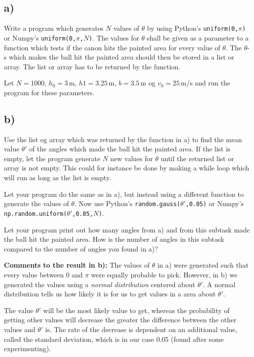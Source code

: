 \documentclass[10pt,a4paper]{article}
\begin{document}
\subsection*{a)}
Write a program which generates $N$ values of $\theta$ by using Python's  \texttt{uniform(0,$\pi$)} or  Numpy's \texttt{uniform(0,$\pi$,$N$)}.
The values for $\theta$ shall be given as a parameter to a function which tests if the canon hits the painted area for every value of $\theta$. 
The $\theta$-s which makes the ball hit the painted area should then be stored in a list or array. The list or array has to be returned by the function. 

Let $N = 1000$, $h_0 = 3\,$m, $h1 = 3.25\,$m, $b = 3.5\,$m og $v_0 = 25\,$m/s and run the program for these parameters.
\subsection*{b)}
Use the list og array which was returned by the function in a) to find the mean value  $\theta'$ of the angles which made the ball hit the painted area. If the list is empty, let the program generate $N$ new values for $\theta$ until the returned list or array is not empty. This could for instance be done by making a while loop which will run as long as the list is empty. 

Let your program do the same as in a), but instead using a different function to generate the values of $\theta$. Now use Python's  \texttt{random.gauss($\theta'$,0.05)} or  Numpy's \texttt{np.random.uniform($\theta'$,0.05,$N$)}.

Let your program print out how many angles from a) and from this subtask made the ball hit the painted area. How is the number of angles in this subtask compared to the number of angles you found in a)?

\textbf{Comments to the result in b):} The values of $\theta$ in a) were generated such that every value between 0 and $\pi$ were equally probable to pick. However, in b) we generated the values using a \textit{normal distribution} centered about $\theta'$.
A normal distribution tells us how likely it is for us to get values in a area about $\theta'$. 

The value $\theta'$ will be the most likely value to get, whereas the probability of getting other values will decrease the greater the difference between the other values and $\theta'$ is. The rate of the decrease is dependent on an additional value, called the standard deviation, which is in our case 0.05 (found after some experimenting). 
\end{document}
